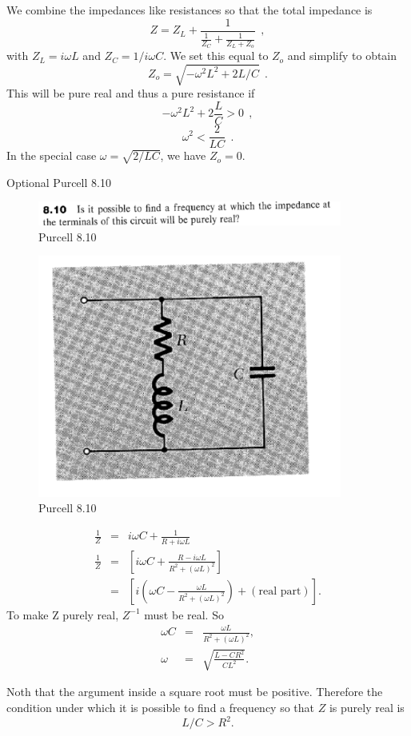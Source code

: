 \documentclass[makesolutionspdf]{esg8022pset}
\begin{document}
\begin{solution}
We combine the impedances like resistances so that the total impedance is
\[ Z = Z_L + \frac{1}{\frac{1}{Z_C} + \frac{1}{Z_L + Z_o}}\ \ , \]
with $Z_L = i\omega L$ and $Z_C = 1/i\omega C$. We set this equal to $Z_o$ and simplify to obtain
\[ Z_o = \sqrt{-\omega^2L^2 + 2L/C}\ \ .\]
This will be pure real and thus a pure resistance if
\[ -\omega^2L^2 + 2\frac{L}{C} >0 \ \ ,\]
\[ \omega^2 < \frac{2}{LC}\ \ .\]
In the special case $\omega = \sqrt{2/LC}$, we have $Z_o=0$. 
\end{solution}

\begin{problem}{Optional Purcell 8.10}
\begin{figure}[H]
    \centering
    \includegraphics[width = 10cm]{pu810}
    \caption{Purcell 8.10}
  \end{figure}
  
  \begin{figure}[H]
    \centering
    \includegraphics[width = 10cm]{figpu810}
    \caption{Purcell 8.10}
  \end{figure}
\end{problem}
\begin{solution}
\begin{eqnarray}
\frac{1}{Z} &=& i\omega C + \frac{1}{R+i\omega L}\nonumber\\
\frac{1}{Z} &=&\left[i\omega C+\frac{R-i\omega L}{R^2+(\omega
L)^2}\right]\nonumber\\
&=& \left[ i(\omega C-\frac{\omega L}{R^2+(\omega
L)^2})+(\textrm{real part})\right].
\end{eqnarray}
To make Z purely real, $Z^{-1}$ must be real.  So
\begin{eqnarray}
\omega C &=& \frac{\omega L}{R^2+(\omega L)^2},\\
\omega &=& \sqrt{\frac{L-CR^2}{CL^2}}.
\end{eqnarray}

Noth that the argument inside a square root must be positive.
Therefore the condition under which it is possible to find 
a frequency so that $Z$ is purely real is 
\begin{equation}
L/C>R^2.
\end{equation}
\end{solution}
\end{document}
